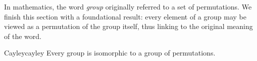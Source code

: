 % 


   
In mathematics, the word \emph{group} originally referred to a set of permutations. We finish this section with a foundational result: every element of a group may be viewed as a permutation of the group itself, thus linking to the original meaning of the word.

\begin{thm}{Cayley}{cayley}
Every group is isomorphic to a group of permutations.
\end{thm}

